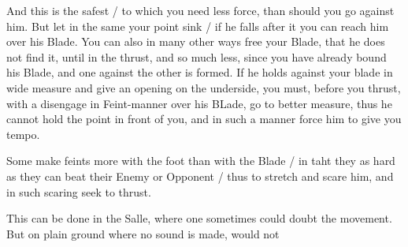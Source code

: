 And this is the safest / to which you need less force, than should you
go against him. But let in the same your point sink / if he falls
after it you can reach him over his Blade. You can also in many other
ways free your Blade, that he does not find it, until in the thrust,
and so much less, since you have already bound his Blade, and one
against the other is formed. If he holds against your blade in wide
measure and give an opening on the underside, you must, before you
thrust, with a disengage in Feint-manner over his BLade, go to better
measure, thus he cannot hold the point in front of you, and in such a
manner force him to give you tempo.



Some make feints more with the foot than with the Blade / in taht they
as hard as they can beat their Enemy or Opponent / thus to stretch and
scare him, and in such scaring seek to thrust.


This can be done in the Salle, where one sometimes could doubt the
movement. But on plain ground where no sound is made, would not